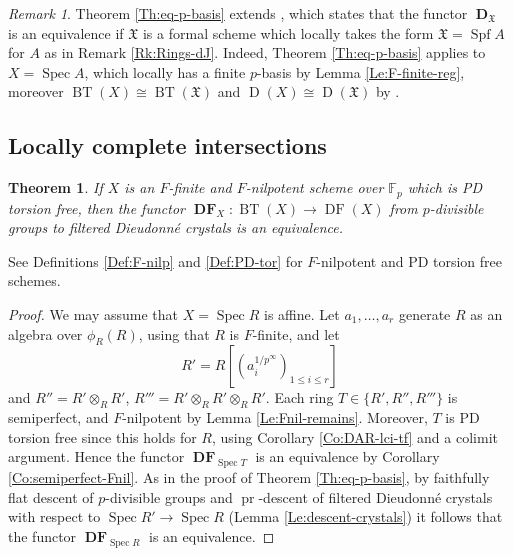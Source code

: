\documentclass[a4paper,11pt]{article}
\theoremstyle{plain}
\newtheorem{Thm}[Lemma]{Theorem}
\theoremstyle{definition}
\theoremstyle{remark}
\newtheorem{Remark}[Lemma]{Remark}
\theoremstyle{definition}
\numberwithin{Lemma}{section}
\numberwithin{Subpoint}{Lemma}
\numberwithin{equation}{section}
\newcommand{\FX}{\mathfrak{X}}
\newcommand{\DD}{{\mathbb{D}}}
\newcommand{\FF}{{\mathbb{F}}}
\DeclareMathOperator{\BT}{BT}
\DeclareMathOperator{\Dcat}{D}
\DeclareMathOperator{\Dfun}{\mathbf D} %
\DeclareMathOperator{\DFcat}{DF}
\DeclareMathOperator{\DFfun}{\mathbf{DF}} %
\DeclareMathOperator{\Spec}{Spec}
\DeclareMathOperator{\Spf}{Spf}
\newcommand{\nameoftop}{{\operatorname{pr}}}
\newcommand{\chang}[1]{{#1}}
\begin{document}
\begin{Remark}
\label{Rk:dJ-case}
Theorem \ref{Th:eq-p-basis} extends
\cite[Main Theorem 1]{Jong:Crystalline}, 
which states that the functor $\Dfun_{\FX}$ is an equivalence 
if $\FX$ is a formal scheme which locally takes the form $\FX=\Spf A$ 
for $A$ as in Remark \ref{Rk:Rings-dJ}.
Indeed, Theorem \ref{Th:eq-p-basis} applies to $X=\Spec A$,
\chang{which locally has a finite $p$-basis by Lemma \ref{Le:F-finite-reg},}
moreover $\BT(X)\cong\BT(\FX)$ and $\Dcat(X)\cong\Dcat(\FX)$
by \cite[Lemma 2.4.4 \& Prop.\ 2.4.8]{Jong:Crystalline}.
\end{Remark}

\subsection{Locally complete intersections}

\begin{Thm}
\label{Th:eq-Ffin-Fnil-tf}
If $X$ is an $F$-finite and $F$-nilpotent scheme over $\FF_p$
which is PD torsion free, then the functor\/
$
\DFfun_X:\BT(X)\to\DFcat(X)
$
from $p$-divisible groups to filtered Dieudonn\'e crystals is an equivalence.
\end{Thm}

See Definitions \ref{Def:F-nilp} and \ref{Def:PD-tor}
for $F$-nilpotent and PD torsion free schemes.


\begin{proof}
We \chang{may} assume that $X=\Spec R$ \chang{is affine}.
Let $a_1,\ldots,a_r$ generate $R$ as an algebra over $\phi_R(R)$,
using that $R$ is $F$-finite, and let 
\begin{equation}
\label{Eq:R'}
R'=R[(a_i^{1/p^\infty})_{1\le i\le r}]
\end{equation}
and $R''=R'\otimes_RR'$, {} $R'''=R'\otimes_RR'\otimes_RR'$.
Each ring $T\in\{R',R'',R'''\}$
is semiperfect, and $F$-nilpotent by Lemma \ref{Le:Fnil-remains}.
\chang{Moreover, $T$ is PD torsion free since this holds for $R$, 
using Corollary \ref{Co:DAR-lci-tf} and a colimit argument.
Hence the functor $\DFfun_{\Spec T}$ is an equivalence by Corollary \ref{Co:semiperfect-Fnil}.}
\chang{As in the proof of Theorem \ref{Th:eq-p-basis}, by faithfully flat descent of $p$-divisible groups and 
$\nameoftop$-descent of filtered Dieudonn\'e crystals \chang{with respect to} 
$\Spec R'\to\Spec R$ (Lemma \ref{Le:descent-crystals})
it follows that the functor $\DFfun_{\Spec R}$ is an equivalence.}
\end{proof}
\end{document}
